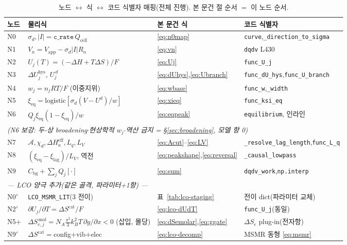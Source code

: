 \documentclass[11pt,a4paper]{article}
\newcommand{\eff}{\mathrm{eff}}
\newcommand{\eq}{\mathrm{eq}}
\newcommand{\app}{\mathrm{app}}
\newcommand{\cell}{\mathrm{cell}}
\newcommand{\bg}{\mathrm{bg}}
\newcommand{\hys}{\mathrm{hys}}
\newcommand{\code}[1]{\texttt{#1}}
\begin{document}
\begin{table}[t]
\centering
\renewcommand{\arraystretch}{1.3}
\caption{노드 $\leftrightarrow$ 식 $\leftrightarrow$ 코드 식별자 매핑(전체 진행). 본 문건 절 순서 $=$ 이 노드 순서.}
\label{tab:nodemap}
\begin{tabular}{l l l l}
\toprule
노드 & 물리식 & 본 문건 식 & 코드 식별자 \\
\midrule
N0 & $\sigma_d,|I|=\code{c\_rate}\,Q_\cell$ & \eqref{eq:n0map} & \code{curve},\code{\_direction\_to\_sigma} \\
N1 & $V_n=V_\app-\sigma_d|I|R_n$ & \eqref{eq:vn} & \code{dqdv} L430 \\
N2 & $U_j(T)=(-\Delta H+T\Delta S)/F$ & \eqref{eq:Uj} & \code{func\_U\_j} \\
N3 & $\Delta U_j^\hys$, $U_j^{\,d}$ & \eqref{eq:dUhys},\eqref{eq:Ubranch} & \code{func\_dU\_hys},\code{func\_U\_branch} \\
N4 & $w_j=n_jRT/F$ (이중지위) & \eqref{eq:wbase} & \code{func\_w},\code{\_width} \\
N5 & $\xi_\eq=\mathrm{logistic}[\sigma_d(V-U^d)/w]$ & \eqref{eq:xieq} & \code{func\_ksi\_eq} \\
N6 & $Q_j\xi_\eq(1-\xi_\eq)/w$ & \eqref{eq:eqpeak} & \code{equilibrium}, 인라인 \\
\multicolumn{4}{l}{\emph{\quad(N6 보강: 두-상 broadening$\cdot$현상학적 $w_j$$\cdot$역산 금지 = \S\ref{sec:broadening}, 모델 항 0)}}\\
N7 & $\mathcal A,\chi_d,\Delta H_a^\eff,L_q,L_V$ & \eqref{eq:Acut}--\eqref{eq:LV} & \code{\_resolve\_lag\_length},\code{func\_L\_q} \\
N8 & $(\xi_\eq-\xi_\mathrm{lag})/L_V$, 역전 & \eqref{eq:peakshape},\eqref{eq:reversal} & \code{\_causal\_lowpass} \\
N9 & $C_\bg+\sum_jQ_j[\cdot]$ & \eqref{eq:sum} & \code{dqdv\_work},\code{np.interp} \\
\midrule
\multicolumn{4}{l}{\emph{— LCO 양극 추가(같은 골격, 파라미터+1항) —}}\\
N0$'$ & \code{LCO\_MSMR\_LIT}(3 전이) & 표~\ref{tab:lco-staging} & 전이 dict(파라미터 교체) \\
N2$'$ & $\partial U_j/\partial T=\Delta S^\mathrm{cat}/F$ & \eqref{eq:lco-dUdT} & \code{func\_U\_j}(동일) \\
N5$+$ & $\Delta S_{e,j}^{\,\mathrm{mol}}=N_A\tfrac{\pi^2}{3}k_B^2T\,\partial g/\partial x<0$ (삽입, 몰당) & \eqref{eq:dSemolar},\eqref{eq:ggate} & $\Delta S_e$ plug-in(전자항) \\
N9$'$ & $\Delta S^\mathrm{cat}=$config$+$vib$+$elec & \eqref{eq:lco-decomp} & MSMR 동형 \eqref{eq:msmr} \\
\bottomrule
\end{tabular}
\end{table}
\end{document}
